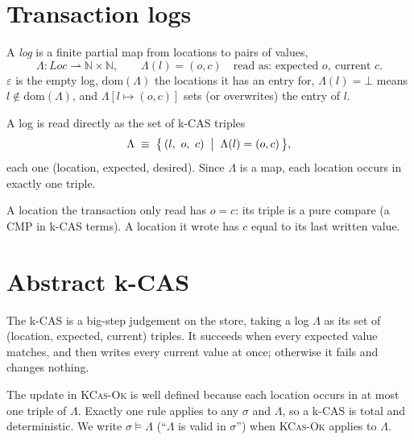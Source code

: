 \documentclass[manuscript,nonacm]{acmart}
\theoremstyle{acmdefinition}
\newcommand{\Loc}{\mathit{Loc}}
\newcommand{\Lg}{\Lambda}                         %
\newcommand{\emptylog}{\varepsilon}
\newcommand{\logupd}[4]{#1[#2 \mapsto (#3,#4)]}    %
\newcommand{\dom}[1]{\mathrm{dom}(#1)}
\newcommand{\kcas}[1]{\mathsf{kcas}(#1)}
\newcommand{\kok}[3]{#1 \vdash \kcas{#2} \Downarrow #3}
\newcommand{\kfail}[2]{#1 \vdash \kcas{#2} \Downarrow \mathsf{fail}}
\newcommand{\valid}[2]{#1 \models #2}
\begin{document}
\pagestyle{plain}

\section{Transaction logs}
\label{sec:log}

\begin{definition}[Log]
A \emph{log} is a finite partial map from locations to pairs of values,
\[
\Lg : \Loc \rightharpoonup \mathbb{N} \times \mathbb{N},
\qquad
\Lg(l) = (o, c) \quad\text{read as: expected } o,\ \text{current } c .
\]
$\emptylog$ is the empty log, $\dom{\Lg}$ the locations it has an entry for,
$\Lg(l) = \bot$ means $l \notin \dom{\Lg}$, and $\logupd{\Lg}{l}{o}{c}$ sets
(or overwrites) the entry of $l$.
\end{definition}


\begin{definition}
A log is read directly as the set of k-CAS triples
\[
\Lg \;\equiv\; \bigl\{\, (l,\ o,\ c) \;\bigm|\; \Lg(l) = (o,c) \,\bigr\},
\]
each one (location, expected, desired). Since $\Lg$ is a map, each location
occurs in exactly one triple.
\end{definition}

A location the transaction only read has $o = c$: its triple is a pure compare
(a CMP in k-CAS terms). A location it wrote has $c$ equal to its last written
value.

\section{Abstract k-CAS}
\label{sec:kcas}

The k-CAS is a big-step judgement on the store, taking a log $\Lg$ as its set
of (location, expected, current) triples. It succeeds when every expected value
matches, and then writes every current value at once; otherwise it fails and
changes nothing.
The update in \textsc{KCas-Ok} is well defined because each location occurs in
at most one triple of $\Lg$. Exactly one rule applies to any $\sigma$ and
$\Lg$, so a k-CAS is total and deterministic. We write $\valid{\sigma}{\Lg}$
(``$\Lg$ is valid in $\sigma$'') when \textsc{KCas-Ok} applies to $\Lg$.
\end{document}
